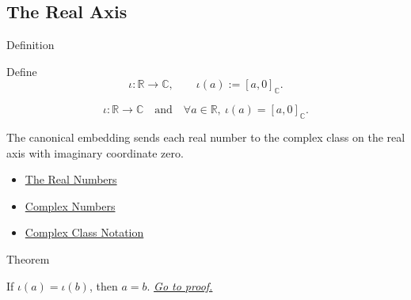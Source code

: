 \subsection*{The Real Axis}

\begin{definitionbox}{Definition}
\begin{definition}
\label{def:canonical-embedding-r-into-c}
Define
\[
\iota:\mathbb{R}\to\mathbb{C},
\qquad
\iota(a):=[a,0]_{\mathbb{C}}.
\]
\end{definition}
\end{definitionbox}


\begin{remark*}
\[
\iota:\mathbb{R}\to\mathbb{C}
\quad\text{and}\quad
\forall a\in\mathbb{R},\ \iota(a)=[a,0]_{\mathbb{C}}.
\]
\end{remark*}

\begin{remark*}[Interpretation]
The canonical embedding sends each real number to the complex class on the real axis with imaginary coordinate zero.
\end{remark*}

\begin{dependencies}
\begin{itemize}
  \item \hyperref[def:reals]{The Real Numbers}
  \item \hyperref[def:complex-numbers]{Complex Numbers}
  \item \hyperref[def:complex-class-notation]{Complex Class Notation}
\end{itemize}
\end{dependencies}

\begin{theorembox}{Theorem}
\begin{theorem}
\label{thm:embedding-r-into-c-injective}
If \(\iota(a)=\iota(b)\), then \(a=b\).
\hyperref[prf:embedding-r-into-c-injective]{\textit{Go to proof.}}
\end{theorem}
\end{theorembox}


